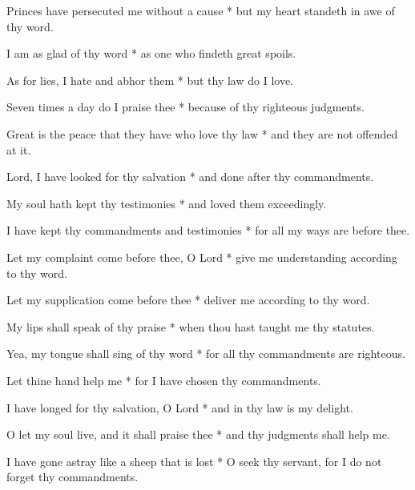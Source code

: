 Princes have persecuted me without a cause * but my heart standeth in awe of thy word.

I am as glad of thy word * as one who findeth great spoils.

As for lies, I hate and abhor them * but thy law do I love.

Seven times a day do I praise thee * because of thy righteous judgments.

Great is the peace that they have who love thy law * and they are not offended at it.

Lord, I have looked for thy salvation * and done after thy commandments.

My soul hath kept thy testimonies * and loved them exceedingly.

I have kept thy commandments and testimonies * for all my ways are before thee.

Let my complaint come before thee, O Lord * give me understanding according to thy word.

Let my supplication come before thee * deliver me according to thy word.

My lips shall speak of thy praise * when thou hast taught me thy statutes.

Yea, my tongue shall sing of thy word * for all thy commandments are righteous.

Let thine hand help me * for I have chosen thy commandments.

I have longed for thy salvation, O Lord * and in thy law is my delight.

O let my soul live, and it shall praise thee * and thy judgments shall help me.

I have gone astray like a sheep that is lost * O seek thy servant, for I do not forget thy commandments.